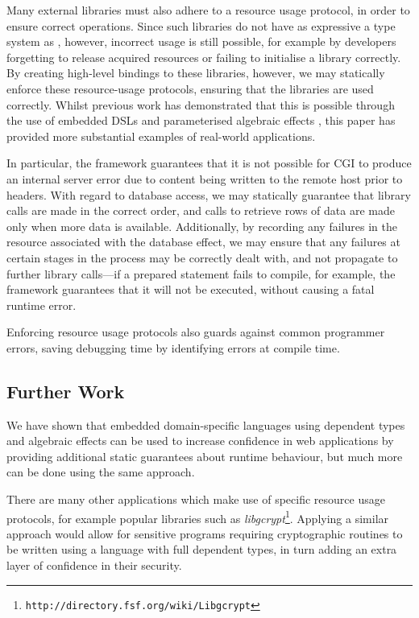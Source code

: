 \documentclass[preprint]{sigplanconf}
\begin{document}
Many external libraries must also adhere to a resource usage protocol, in order to ensure correct operations. Since such libraries do not have as expressive a type system as \idris{}, however, incorrect usage is still possible, for example by developers forgetting to release acquired resources or failing to initialise a library correctly. By creating high-level bindings to these libraries, however, we may statically enforce these resource-usage protocols, ensuring that the libraries are used correctly. Whilst previous work has demonstrated that this is possible through the use of embedded DSLs \cite{brady:edsl} and parameterised algebraic effects \cite{brady:effects}, this paper has provided more substantial examples of real-world applications. 

In particular, the framework guarantees that it is not possible for CGI to produce an internal server error due to content being written to the remote host prior to headers. With regard to database access, we may statically guarantee that library calls are made in the correct order, and calls to retrieve rows of data are made only when more data is available. Additionally, by recording any failures in the resource associated with the database effect, we may ensure that any failures at certain stages in the process may be correctly dealt with, and not propagate to further library calls---if a prepared statement fails to compile, for example, the framework guarantees that it will not be executed, without causing a fatal runtime error.

Enforcing resource usage protocols also guards against common programmer errors, saving debugging time by identifying errors at compile time.
\subsection{Further Work}
We have shown that embedded domain-specific languages using dependent types and algebraic effects can be used to increase confidence in web applications by providing additional static guarantees about runtime behaviour, but much more can be done using the same approach.

There are many other applications which make use of specific resource usage protocols, for example popular libraries such as \textit{libgcrypt}\footnote{\texttt{http://directory.fsf.org/wiki/Libgcrypt}}. Applying a similar approach would allow for sensitive programs requiring cryptographic routines to be written using a language with full dependent types, in turn adding an extra layer of confidence in their security. 
\end{document}
